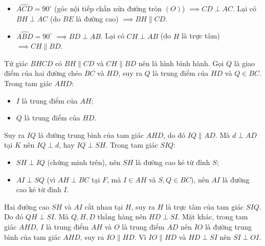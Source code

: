 \begin{bt}
{\begin{enumerate}[a)]
	\begin{itemize}
		\item $\widehat{ACD} = 90^\circ$ (góc nội tiếp chắn nửa đường tròn $(O)$) $\implies CD \perp AC$.
		Lại có $BH \perp AC$ (do $BE$ là đường cao) $\implies BH \parallel CD$.
		\item $\widehat{ABD} = 90^\circ$ $\implies BD \perp AB$.
		Lại có $CH \perp AB$ (do $H$ là trực tâm) $\implies CH \parallel BD$.
	\end{itemize}
	Tứ giác $BHCD$ có $BH \parallel CD$ và $CH \parallel BD$ nên là hình bình hành.
	Gọi $Q$ là giao điểm của hai đường chéo $BC$ và $HD$, suy ra $Q$ là trung điểm của $HD$ và $Q \in BC$.
	Trong tam giác $AHD$:
	\begin{itemize}
		\item $I$ là trung điểm của $AH$;
		\item $Q$ là trung điểm của $HD$.
	\end{itemize}
	Suy ra $IQ$ là đường trung bình của tam giác $AHD$, do đó $IQ \parallel AD$.
	Mà $d \perp AD$ tại $K$ nên $IQ \perp d$, hay $IQ \perp SH$.
	Trong tam giác $SIQ$:
	\begin{itemize}
		\item $SH \perp IQ$ (chứng minh trên), nên $SH$ là đường cao kẻ từ đỉnh $S$;
		\item $AI \perp SQ$ (vì $AH \perp BC$ tại $F$, mà $I \in AH$ và $S, Q \in BC$), nên $AI$ là đường cao kẻ từ đỉnh $I$.
	\end{itemize}
	Hai đường cao $SH$ và $AI$ cắt nhau tại $H$, suy ra $H$ là trực tâm của tam giác $SIQ$.
	Do đó $QH \perp SI$. Mà $Q, H, D$ thẳng hàng nên $HD \perp SI$.
	Mặt khác, trong tam giác $AHD$, $I$ là trung điểm $AH$ và $O$ là trung điểm $AD$ nên $IO$ là đường trung bình của tam giác $AHD$, suy ra $IO \parallel HD$.
	Vì $IO \parallel HD$ và $HD \perp SI$ nên $SI \perp OI$.
\end{enumerate}
}
\end{bt}


